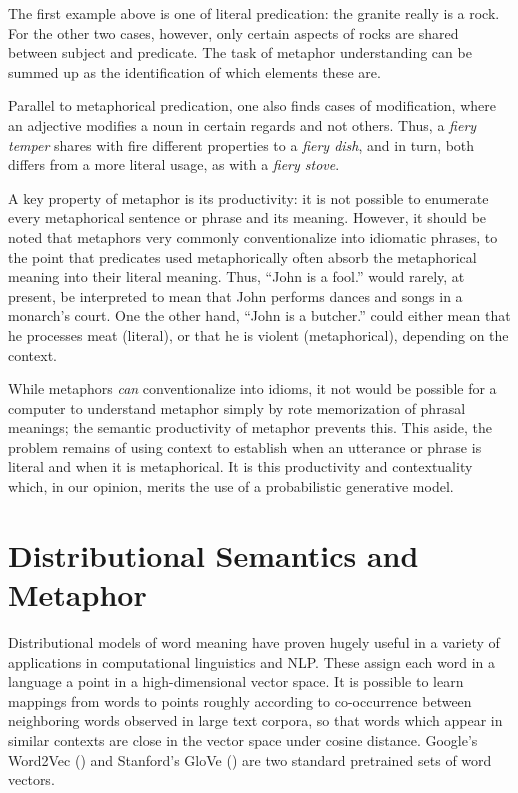 \documentclass[10pt,letterpaper,twocolumn]{article}
\begin{document}
The first example above is one of literal predication: the granite really is a rock. For the other two cases, however, only certain aspects of rocks are shared between subject and predicate. The task of metaphor understanding can be summed up as the identification of which elements these are.

Parallel to metaphorical predication, one also finds cases of modification, where an adjective modifies a noun in certain regards and not others. Thus, a \emph{fiery temper} shares with fire different properties to a \emph{fiery dish}, and in turn, both differs from a more literal usage, as with a \emph{fiery stove}.

A key property of metaphor is its productivity: it is not possible to enumerate every metaphorical sentence or phrase and its meaning. However, it should be noted that metaphors very commonly conventionalize into idiomatic phrases, to the point that predicates used metaphorically often absorb the metaphorical meaning into their literal meaning. Thus, ``John is a fool.'' would rarely, at present, be interpreted to mean that John performs dances and songs in a monarch's court. One the other hand, ``John is a butcher.'' could either mean that he processes meat (literal), or that he is violent (metaphorical), depending on the context.

While metaphors \emph{can} conventionalize into idioms, it not would be possible for a computer to understand metaphor simply by rote memorization of phrasal meanings; the semantic productivity of metaphor prevents this. This aside, the problem remains of using context to establish when an utterance or phrase is literal and when it is metaphorical. It is this productivity and contextuality which, in our opinion, merits the use of a probabilistic generative model. 



\section{Distributional Semantics and Metaphor} \label{distmods}

Distributional models of word meaning have proven hugely useful in a variety of applications in computational linguistics and NLP. These assign each word in a language a point in a high-dimensional vector space. It is possible to learn mappings from words to points roughly according to co-occurrence between neighboring words observed in large text corpora, so that words which appear in similar contexts are close in the vector space under cosine distance. Google's Word2Vec (\cite{mikolov2013distributed}) and Stanford's GloVe (\cite{pennington2014glove}) are two standard pretrained sets of word vectors.
\end{document}
